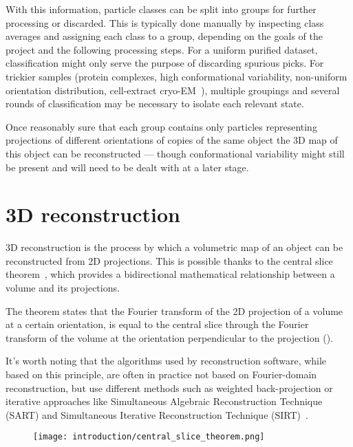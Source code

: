 With this information, particle classes can be split into groups for further processing or discarded.
This is typically done manually by inspecting class averages and assigning each class to a group, depending on the goals of the project and the following processing steps.
For a uniform purified dataset, classification might only serve the purpose of discarding spurious picks.
For trickier samples (protein complexes, high conformational variability, non-uniform orientation distribution, cell-extract cryo-EM~\cite{suBuildRetrieveMethodology2021,kyrilisIntegrativeBiologyNative2019}), multiple groupings and several rounds of classification may be necessary to isolate each relevant state.

Once reasonably sure that each group contains only particles representing projections of different orientations of copies of the same object the 3D map of this object can be reconstructed --- though conformational variability might still be present and will need to be dealt with at a later stage.

\section{3D reconstruction}\label{em_reconstruction}

3D reconstruction is the process by which a volumetric map of an object can be reconstructed from 2D projections.
This is possible thanks to the central slice theorem~\cite{wikipediaProjectionsliceTheorem2023}, which provides a bidirectional mathematical relationship between a volume and its projections.

The theorem states that the Fourier transform of the 2D projection of a volume at a certain orientation, is equal to the central slice through the Fourier transform of the volume at the orientation perpendicular to the projection ().

It's worth noting that the algorithms used by reconstruction software, while based on this principle, are often in practice not based on Fourier-domain reconstruction, but use different methods such as weighted back-projection or iterative approaches like Simultaneous Algebraic Reconstruction Technique (SART) and Simultaneous Iterative Reconstruction Technique (SIRT)~\cite{andersenSimultaneousAlgebraicReconstruction1984,agulleiroFastTomographicReconstruction2011,wikipediaTomographicReconstruction2024}.

\begin{figure}[!ht]
    \centering
    \texttt{[image: introduction/central\_slice\_theorem.png]}
    \label{fig:em_central_slice}
\end{figure}

